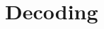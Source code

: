 \section{Decoding}
\begin{comment}
\frame[plain,shrink]{			
				\frametitle{Decoding by Parsing}
				\begin{center}
					\only<1>{J' ai les yeux noirs}
					\only<2>{\cred{J'}\indice{1} ai les yeux noirs}
					\only<3>{\cred{J'}\indice{1} ai les yeux \cblue{noirs}\indice{2}}
					\only<4>{\cred{J'}\indice{1} ai \cgreen{les yeux}\indice{3} \cblue{noirs}\indice{2}}
					\only<5->{\cred{J'}\indice{1} \cbrown{ai}\indice{4} \cgreen{les yeux}\indice{3} \cblue{noirs}\indice{2}}
				\end{center}
				\vspace{5pt}
				
				\only<2>{
				\begin{columns}
					\begin{column}{6cm}
						\Tree
						[ J'\indice{1} ].{PRP0\indice{1}}
					\end{column}
					\begin{column}{6cm}
						\Tree
						[ I\indice{1} ].{PRP\indice{1}}
					\end{column}
				\end{columns}
				}
				
				\only<3>{
				\begin{columns}
					\begin{column}{6cm}
						\Tree
						[ J'\indice{1} ].{PRP0\indice{1}}
						\hspace{20pt}
						\Tree
						[ noirs\indice{2} ].{JJ\indice{2}}
					\end{column}
					\begin{column}{6cm}
						\Tree
						[ I\indice{1} ].{PRP\indice{1}}
						\hspace{20pt}
						\Tree
						[ black\indice{2} ].{JJ\indice{2}}
					\end{column}
				\end{columns}
				}
				
				\only<4>{
				\begin{columns}
					\begin{column}{6cm}
						\Tree
						[ J'\indice{1} ].{PRP0\indice{1}}
						\hspace{10pt}
						\Tree
						[.{NP0\indice{3}}
							[ les\indice{3} ].{DT\indice{3}}
							[ yeux\indice{3} ].{NN\indice{3}}
							[ noirs\indice{2} ].{JJ\indice{2}}
						]
						

\end{comment}
